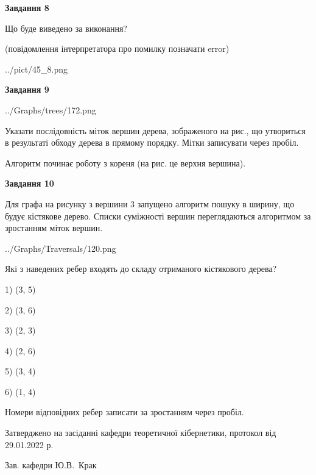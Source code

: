 \documentclass[12pt, ukrainian]{article}
\begin{document}
{\begin {large}
{\begin {center}\textbf{Завдання 8}\end {center}}\par
Що буде виведено за виконання?\par
 (повідомлення інтерпретатора про помилку позначати error)\par
\begin{center}
	{../pict/45_8.png}
\end{center}
\newpage

{\begin {center}\textbf{Завдання 9}\end {center}}\par

\begin{center}
	{../Graphs/trees/172.png}
\end{center}
Указати послідовність міток вершин дерева, зображеного на рис., що утвориться в результаті обходу дерева в прямому порядку. Мітки записувати через пробіл.\par Алгоритм починає роботу з кореня (на рис. це верхня вершина).\par
\newpage

{\begin {center}\textbf{Завдання 10}\end {center}}\par
Для графа на рисунку з вершини 3 запущено алгоритм пошуку в ширину, що будує кістякове дерево. Списки суміжності вершин переглядаються алгоритмом за зростанням міток вершин.\par
\begin{center}
	{../Graphs/Traversals/120.png}
\end{center}
\par Які з наведених ребер входять до складу отриманого кістякового дерева?\par
1) (3, 5)\par
2) (3, 6)\par
3) (2, 3)\par
4) (2, 6)\par
5) (3, 4)\par
6) (1, 4)\par
{\vskip 15pt} Номери відповідних ребер записати за зростанням через пробіл.\par
\newpage


\end {large}
}
{\smallskip \begin {small} Затверджено на засіданні кафедри теоретичної кібернетики, протокол  від   29.01.2022 р.\par\smallskip\smallskip
{\parbox {6.5 cm}{Зав. кафедри \dotfill Ю.В.~Крак}} \end{small}}
\end{document}
